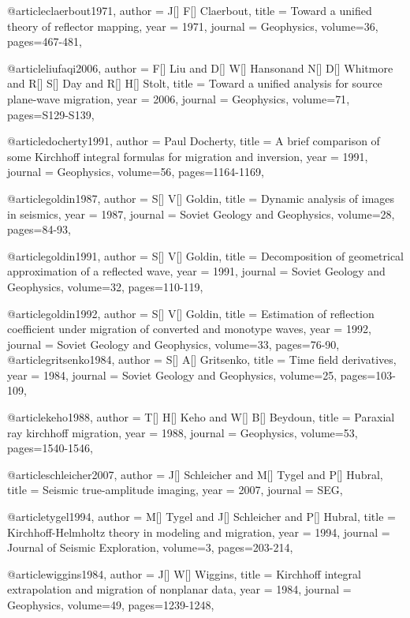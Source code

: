 @article{claerbout1971,
  author =	 {J[] F[] Claerbout},
  title =	 {Toward a unified theory of reflector mapping},
  year =	 1971,
  journal =	 {Geophysics},
  volume={36},
 pages=467-481,
}

@article{liufaqi2006,
  author =	 {F[] Liu and D[] W[] Hansonand N[] D[] Whitmore and R[] S[] Day and R[] H[] Stolt},
  title =	 {Toward a unified analysis for source plane-wave migration},
  year =	 2006,
  journal =	 {Geophysics},
  volume={71},
 pages=S129-S139,
}

@article{docherty1991,
  author =	 {Paul Docherty},
  title =	 {A brief comparison of some Kirchhoff integral formulas for migration and inversion},
  year =	 1991,
  journal =	 {Geophysics},
  volume={56},
 pages=1164-1169,
}

@article{goldin1987,
  author =	 {S[] V[] Goldin},
  title =	 {Dynamic analysis of images in seismics},
  year =	 1987,
  journal =	 {Soviet Geology and Geophysics},
  volume={28},
 pages=84-93,
}

@article{goldin1991,
  author =	 {S[] V[] Goldin},
  title =	 {Decomposition of geometrical approximation of a reflected wave},
  year =	 1991,
  journal =	 {Soviet Geology and Geophysics},
  volume={32},
 pages=110-119,
}

@article{goldin1992,
  author =	 {S[] V[] Goldin},
  title =	 {Estimation of reflection coefficient under migration of converted and monotype waves},
  year =	 1992,
  journal =	 {Soviet Geology and Geophysics},
  volume={33},
 pages=76-90,
}
@article{gritsenko1984,
  author =	 {S[] A[] Gritsenko},
  title =	 {Time field derivatives},
  year =	 1984,
  journal =	 {Soviet Geology and Geophysics},
  volume={25},
 pages=103-109,
}

@article{keho1988,
  author =	 {T[] H[] Keho and W[] B[] Beydoun},
  title =	 {Paraxial ray kirchhoff migration},
  year =	 1988,
  journal =	 {Geophysics},
  volume={53},
 pages=1540-1546,
}

@article{schleicher2007,
  author =	 {J[] Schleicher and M[] Tygel and P[] Hubral},
  title =	 {Seismic true-amplitude imaging},
  year =	 2007,
  journal =	 {SEG},
}

@article{tygel1994,
  author =	 {M[] Tygel and J[] Schleicher and P[] Hubral},
  title =	 {Kirchhoff-Helmholtz theory in modeling and migration},
  year =	 1994,
  journal =	 {Journal of Seismic Exploration},
  volume={3},
 pages=203-214,
}

@article{wiggins1984,
  author =	 {J[] W[] Wiggins},
  title =	 {Kirchhoff integral extrapolation and migration of nonplanar data},
  year =	 1984,
  journal =	 {Geophysics},
  volume={49},
 pages=1239-1248,
}

